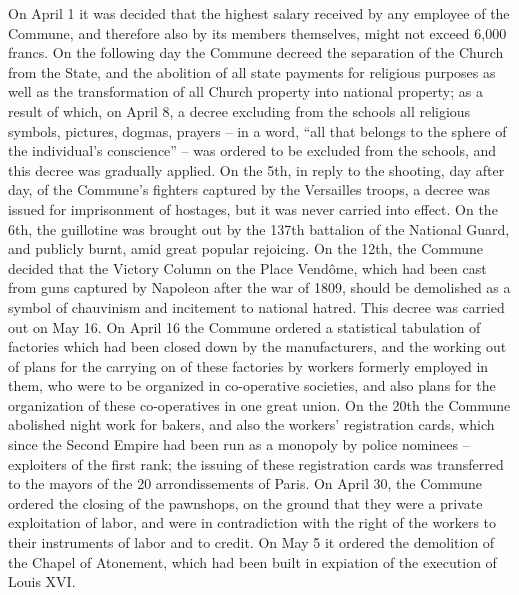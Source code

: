 \documentclass{book}
\begin{document}
On April 1 it was decided that the highest salary received by any employee
of the Commune, and therefore also by its members themselves, might not
exceed 6,000 francs. On the following day the Commune decreed the
separation of the Church from the State, and the abolition of all state
payments for religious purposes as well as the transformation of all
Church property into national property; as a result of which, on April 8,
a decree excluding from the schools all religious symbols, pictures,
dogmas, prayers – in a word, “all that belongs to the sphere of the
individual’s conscience” – was ordered to be excluded from the schools,
and this decree was gradually applied. On the 5th, in reply to the
shooting, day after day, of the Commune’s fighters captured by the
Versailles troops, a decree was issued for imprisonment of hostages, but
it was never carried into effect. On the 6th, the guillotine was brought
out by the 137th battalion of the National Guard, and publicly burnt, amid
great popular rejoicing. On the 12th, the Commune decided that the Victory
Column on the Place Vendôme, which had been cast from guns captured by
Napoleon after the war of 1809, should be demolished as a symbol of
chauvinism and incitement to national hatred. This decree was carried out
on May 16. On April 16 the Commune ordered a statistical tabulation of
factories which had been closed down by the manufacturers, and the working
out of plans for the carrying on of these factories by workers formerly
employed in them, who were to be organized in co-operative societies, and
also plans for the organization of these co-operatives in one great union.
On the 20th the Commune abolished night work for bakers, and also the
workers’ registration cards, which since the Second Empire had been run as
a monopoly by police nominees – exploiters of the first rank; the issuing
of these registration cards was transferred to the mayors of the 20
arrondissements of Paris. On April 30, the Commune ordered the closing of
the pawnshops, on the ground that they were a private exploitation of
labor, and were in contradiction with the right of the workers to their
instruments of labor and to credit. On May 5 it ordered the demolition of
the Chapel of Atonement, which had been built in expiation of the
execution of Louis XVI.
\end{document}
